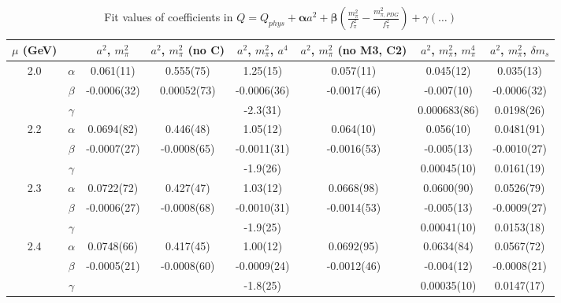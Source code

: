 \documentclass[12pt]{extarticle}
\begin{document}
\begin{table}[h!]
\begin{center}
\begin{tabular}{|c c|c|c|c|c|c|c|}
\hline
$\mu$ (GeV) &  & $a^2$, $m_\pi^2$& $a^2$, $m_\pi^2$ (no C)& $a^2$, $m_\pi^2$, $a^4$& $a^2$, $m_\pi^2$ (no M3, C2)& $a^2$, $m_\pi^2$, $m_\pi^4$& $a^2$, $m_\pi^2$, $\delta m_s$\\
\hline
\multirow{3}{0.5in}{2.0} & $\alpha$ & 0.061(11)& 0.555(75)& 1.25(15)& 0.057(11)& 0.045(12)& 0.035(13)\\
 & $\beta$ & -0.0006(32)& 0.00052(73)& -0.0006(36)& -0.0017(46)& -0.007(10)& -0.0006(32)\\
 & $\gamma$ &  &  & -2.3(31)&  & 0.000683(86)& 0.0198(26)\\
\hline
\multirow{3}{0.5in}{2.2} & $\alpha$ & 0.0694(82)& 0.446(48)& 1.05(12)& 0.064(10)& 0.056(10)& 0.0481(91)\\
 & $\beta$ & -0.0007(27)& -0.0008(65)& -0.0011(31)& -0.0016(53)& -0.005(13)& -0.0010(27)\\
 & $\gamma$ &  &  & -1.9(26)&  & 0.00045(10)& 0.0161(19)\\
\hline
\multirow{3}{0.5in}{2.3} & $\alpha$ & 0.0722(72)& 0.427(47)& 1.03(12)& 0.0668(98)& 0.0600(90)& 0.0526(79)\\
 & $\beta$ & -0.0006(27)& -0.0008(68)& -0.0010(31)& -0.0014(53)& -0.005(13)& -0.0009(27)\\
 & $\gamma$ &  &  & -1.9(25)&  & 0.00041(10)& 0.0153(18)\\
\hline
\multirow{3}{0.5in}{2.4} & $\alpha$ & 0.0748(66)& 0.417(45)& 1.00(12)& 0.0692(95)& 0.0634(84)& 0.0567(72)\\
 & $\beta$ & -0.0005(21)& -0.0008(60)& -0.0009(24)& -0.0012(46)& -0.004(12)& -0.0008(21)\\
 & $\gamma$ &  &  & -1.8(25)&  & 0.00035(10)& 0.0147(17)\\
\hline
\end{tabular}
\caption{Fit values of coefficients in $Q = Q_{phys} + \mathbf{\alpha} a^2 + \mathbf{\beta}\left(\frac{m_\pi^2}{f_\pi^2}-\frac{m_{\pi,PDG}^2}{f_\pi^2}\right) + \gamma(\ldots)$}
\end{center}
\end{table}







\end{document}
